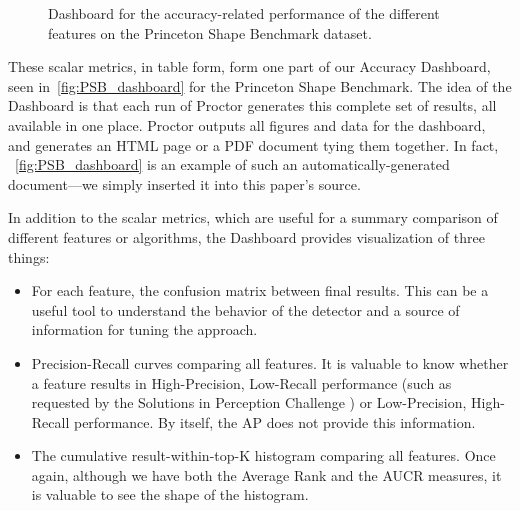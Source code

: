 \begin{figure}[thpb]
  \caption{Dashboard for the accuracy-related performance of the different features on the Princeton Shape Benchmark dataset.}
  \label{fig:PSB_dashboard}
\end{figure}

These scalar metrics, in table form, form one part of our Accuracy Dashboard, seen in~\autoref{fig:PSB_dashboard} for the Princeton Shape Benchmark.
The idea of the Dashboard is that each run of Proctor generates this complete set of results, all available in one place.
Proctor outputs all figures and data for the dashboard, and generates an HTML page or a PDF document tying them together.
In fact, ~\autoref{fig:PSB_dashboard} is an example of such an automatically-generated document---we simply inserted it into this paper's source.

In addition to the scalar metrics, which are useful for a summary comparison of different features or algorithms, the Dashboard provides visualization of three things:
\begin{itemize}
  \item For each feature, the confusion matrix between final results. This can be a useful tool to understand the behavior of the detector and a source of information for tuning the approach.
  \item Precision-Recall curves comparing all features. It is valuable to know whether a feature results in High-Precision, Low-Recall performance (such as requested by the Solutions in Perception Challenge \cite{SIPC2011}) or Low-Precision, High-Recall performance. By itself, the AP does not provide this information.
  \item The cumulative result-within-top-K histogram comparing all features. Once again, although we have both the Average Rank and the AUCR measures, it is valuable to see the shape of the histogram.
\end{itemize}

